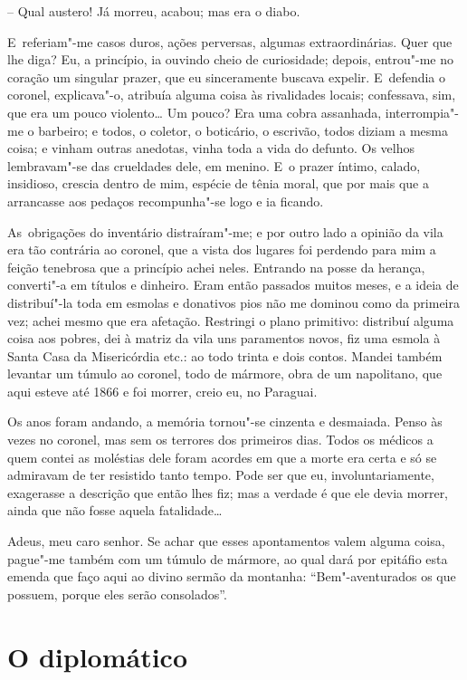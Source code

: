 -- Qual austero! Já morreu, acabou; mas era o diabo.

E~referiam"-me casos duros, ações perversas, algumas extraordinárias.
Quer que lhe diga? Eu, a princípio, ia ouvindo cheio de curiosidade;
depois, entrou"-me no coração um singular prazer, que eu sinceramente
buscava expelir. E~defendia o coronel, explicava"-o, atribuía alguma
coisa às rivalidades locais; confessava, sim, que era um pouco
violento\ldots{} Um pouco? Era uma cobra assanhada, interrompia"-me o
barbeiro; e todos, o coletor, o boticário, o escrivão, todos diziam a
mesma coisa; e vinham outras anedotas, vinha toda a vida do defunto. Os
velhos lembravam"-se das crueldades dele, em menino. E~o prazer íntimo,
calado, insidioso, crescia dentro de mim, espécie de tênia moral, que
por mais que a arrancasse aos pedaços recompunha"-se logo e ia ficando.

As~obrigações do inventário distraíram"-me; e por outro lado a opinião da
vila era tão contrária ao coronel, que a vista dos lugares foi perdendo
para mim a feição tenebrosa que a princípio achei neles. Entrando na
posse da herança, converti"-a em títulos e dinheiro. Eram então passados
muitos meses, e a ideia de distribuí"-la toda em esmolas e donativos pios
não me dominou como da primeira vez; achei mesmo que era afetação.
Restringi o plano primitivo: distribuí alguma coisa aos pobres, dei à
matriz da vila uns paramentos novos, fiz uma esmola à Santa Casa da
Misericórdia etc.: ao todo trinta e dois contos. Mandei também levantar
um túmulo ao coronel, todo de mármore, obra de um napolitano, que aqui
esteve até 1866 e foi morrer, creio eu, no Paraguai.

Os anos foram andando, a memória tornou"-se cinzenta e desmaiada. Penso
às vezes no coronel, mas sem os terrores dos primeiros dias. Todos os
médicos a quem contei as moléstias dele foram acordes em que a morte era
certa e só se admiravam de ter resistido tanto tempo. Pode ser que eu,
involuntariamente, exagerasse a descrição que então lhes fiz; mas a
verdade é que ele devia morrer, ainda que não fosse aquela fatalidade\ldots{}

Adeus, meu caro senhor. Se achar que esses apontamentos valem alguma
coisa, pague"-me também com um túmulo de mármore, ao qual dará por
epitáfio esta emenda que faço aqui ao divino sermão da montanha:
``Bem"-aventurados os que possuem, porque eles serão consolados''.

\chapter{O diplomático}


